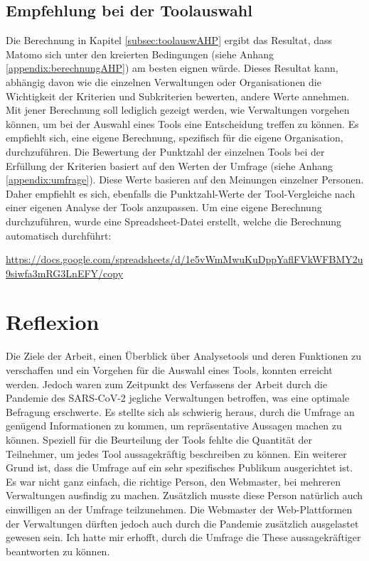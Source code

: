        \subsection{Empfehlung bei der Toolauswahl}
        Die Berechnung in Kapitel \ref{subsec:toolauswAHP} ergibt das Resultat, dass Matomo sich unter den kreierten Bedingungen (siehe Anhang \ref{appendix:berechnungAHP}) am besten eignen würde. Dieses Resultat kann, abhängig davon wie die einzelnen Verwaltungen oder Organisationen die Wichtigkeit der Kriterien und Subkriterien bewerten, andere Werte annehmen. Mit jener Berechnung soll lediglich gezeigt werden, wie Verwaltungen vorgehen können, um bei der Auswahl eines Tools eine Entscheidung treffen zu können. Es empfiehlt sich, eine eigene Berechnung, spezifisch für die eigene Organisation, durchzuführen. Die Bewertung der Punktzahl der einzelnen Tools bei der Erfüllung der Kriterien basiert auf den Werten der Umfrage (siehe Anhang \ref{appendix:umfrage}). Diese Werte basieren auf den Meinungen einzelner Personen. Daher empfiehlt es sich, ebenfalls die Punktzahl-Werte der Tool-Vergleiche nach einer eigenen Analyse der Tools anzupassen. Um eine eigene Berechnung durchzuführen, wurde eine Spreadsheet-Datei erstellt, welche die Berechnung automatisch durchführt:

        \url{https://docs.google.com/spreadsheets/d/1e5vWmMwuKuDppYaflFVkWFBMY2u9siwfa3mRG3LnEFY/copy}


        \newpage

\section{Reflexion}
Die Ziele der Arbeit, einen Überblick über Analysetools und deren Funktionen zu verschaffen und ein Vorgehen für die Auswahl eines Tools, konnten erreicht werden. Jedoch waren zum Zeitpunkt des Verfassens der Arbeit durch die Pandemie des SARS-CoV-2 jegliche Verwaltungen betroffen, was eine optimale Befragung erschwerte. Es stellte sich als schwierig heraus, durch die Umfrage an genügend Informationen zu kommen, um repräsentative Aussagen machen zu können. Speziell für die Beurteilung der Tools fehlte die Quantität der Teilnehmer, um jedes Tool aussagekräftig beschreiben zu können. Ein weiterer Grund ist, dass die Umfrage auf ein sehr spezifisches Publikum ausgerichtet ist. Es war nicht ganz einfach, die richtige Person, den Webmaster, bei mehreren Verwaltungen ausfindig zu machen. Zusätzlich musste diese Person natürlich auch einwilligen an der Umfrage teilzunehmen. Die Webmaster der Web-Plattformen der Verwaltungen dürften jedoch auch durch die Pandemie zusätzlich ausgelastet gewesen sein. Ich hatte mir erhofft, durch die Umfrage die These aussagekräftiger beantworten zu können.

